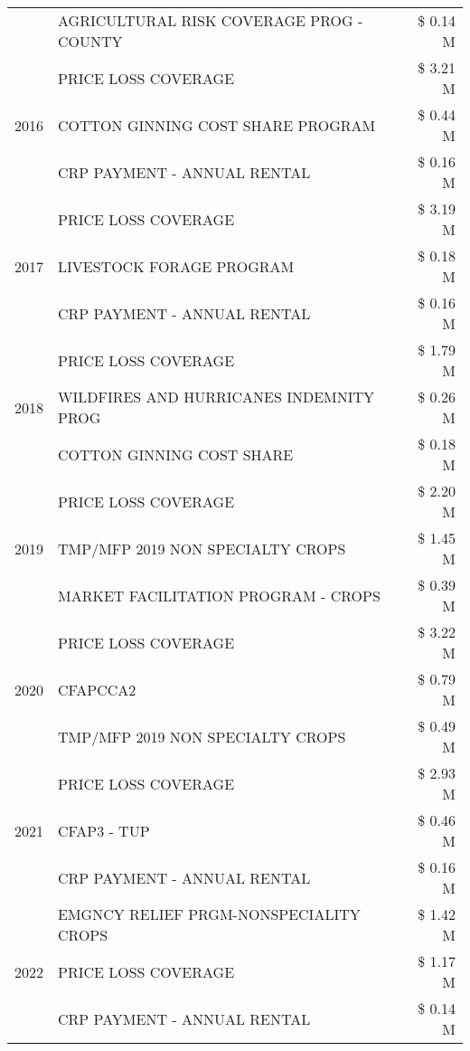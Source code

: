 \begin{tabular}{llr}
 & AGRICULTURAL RISK COVERAGE PROG - COUNTY & \$ 0.14 M \\
\cline{1-3}
\multirow[t]{3}{*}{2016} & PRICE LOSS COVERAGE & \$ 3.21 M \\
 & COTTON GINNING COST SHARE PROGRAM & \$ 0.44 M \\
 & CRP PAYMENT - ANNUAL RENTAL & \$ 0.16 M \\
\cline{1-3}
\multirow[t]{3}{*}{2017} & PRICE LOSS COVERAGE & \$ 3.19 M \\
 & LIVESTOCK FORAGE PROGRAM & \$ 0.18 M \\
 & CRP PAYMENT - ANNUAL RENTAL & \$ 0.16 M \\
\cline{1-3}
\multirow[t]{3}{*}{2018} & PRICE LOSS COVERAGE & \$ 1.79 M \\
 & WILDFIRES AND HURRICANES INDEMNITY PROG & \$ 0.26 M \\
 & COTTON GINNING COST SHARE & \$ 0.18 M \\
\cline{1-3}
\multirow[t]{3}{*}{2019} & PRICE LOSS COVERAGE & \$ 2.20 M \\
 & TMP/MFP 2019 NON SPECIALTY CROPS & \$ 1.45 M \\
 & MARKET FACILITATION PROGRAM - CROPS & \$ 0.39 M \\
\cline{1-3}
\multirow[t]{3}{*}{2020} & PRICE LOSS COVERAGE & \$ 3.22 M \\
 & CFAPCCA2 & \$ 0.79 M \\
 & TMP/MFP 2019 NON SPECIALTY CROPS & \$ 0.49 M \\
\cline{1-3}
\multirow[t]{3}{*}{2021} & PRICE LOSS COVERAGE & \$ 2.93 M \\
 & CFAP3 - TUP & \$ 0.46 M \\
 & CRP PAYMENT - ANNUAL RENTAL & \$ 0.16 M \\
\cline{1-3}
\multirow[t]{3}{*}{2022} & EMGNCY RELIEF PRGM-NONSPECIALITY CROPS & \$ 1.42 M \\
 & PRICE LOSS COVERAGE & \$ 1.17 M \\
 & CRP PAYMENT - ANNUAL RENTAL & \$ 0.14 M \\
\cline{1-3}
\bottomrule
\end{tabular}
